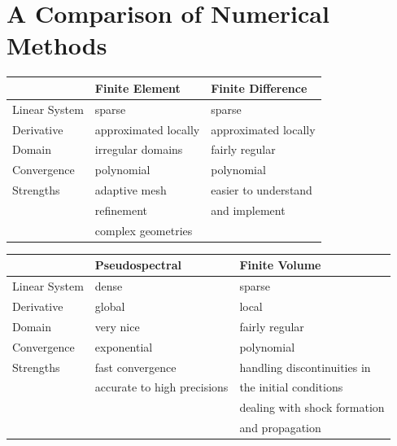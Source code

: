 \section*{A Comparison of Numerical Methods}








\begin{center}
  \begin{tabular}{ l |l l }
     & Finite Element & Finite Difference  \\ \hline
    Linear System& sparse& sparse  \\ 
   Derivative & approximated locally & approximated locally \\
Domain & irregular domains & fairly regular\\
Convergence & polynomial & polynomial \\
Strengths & adaptive mesh & easier to understand \\
&refinement & and implement \\
& complex geometries & \\
    \hline
  \end{tabular}
\end{center}


\begin{center}
  \begin{tabular}{ l |l l }
      & Pseudospectral & Finite Volume \\ \hline
    Linear System & dense & sparse \\ 
   Derivative & global & local\\
Domain  & very nice & fairly regular\\
Convergence  & exponential & polynomial\\
Strengths  & fast convergence & handling discontinuities in \\
& accurate to high precisions &the initial conditions \\
& & dealing with shock formation \\
& & and propagation \\
    \hline
  \end{tabular}
\end{center}

